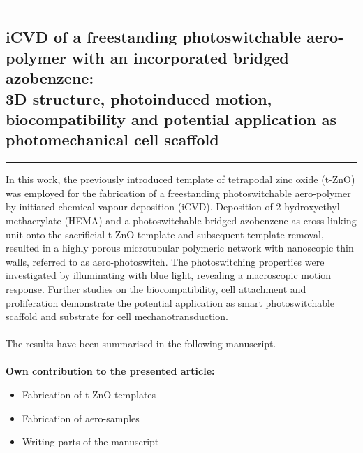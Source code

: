 \vspace{1cm}
\hrule
\vspace{0.3cm}
\subsection*{\Huge iCVD of a freestanding photoswitchable aero-polymer with an incorporated bridged azobenzene:\\ 3D structure, photoinduced motion, biocompatibility and potential application as photomechanical cell scaffold }
\hrule
\vspace{1.5cm}

In this work, the previously introduced template of tetrapodal zinc oxide (t-ZnO) was employed for the fabrication of a freestanding photoswitchable aero-polymer by initiated chemical vapour deposition (iCVD). Deposition of 2-hydroxyethyl methacrylate (HEMA) and a photoswitchable bridged azobenzene as cross-linking unit onto the sacrificial t-ZnO template and subsequent template removal, resulted in a highly porous microtubular polymeric network with nanoscopic thin walls, referred to as aero-photoswitch. The photoswitching properties were investigated by illuminating with blue light, revealing a macroscopic motion response. Further studies on the biocompatibility, cell attachment and proliferation demonstrate the potential application as smart photoswitchable scaffold and substrate for cell mechanotransduction.\\\\ 

The results have been summarised in the following manuscript. \\\\

\textbf{Own contribution to the presented article:}
\begin{itemize}
\item Fabrication of t-ZnO templates
\item Fabrication of aero-samples
\item Writing parts of the manuscript
\end{itemize}

\newpage
% 
% 


